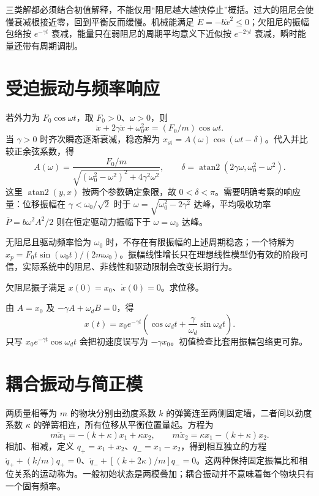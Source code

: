 \documentclass[UTF8,12pt,a4paper,fontset=fandol]{ctexbook}
\begin{document}
三类解都必须结合初值解释，不能仅用“阻尼越大越快停止”概括。过大的阻尼会使慢衰减根接近零，回到平衡反而缓慢。机械能满足 $\dot E=-b\dot x^2\le0$；欠阻尼的振幅包络按 $e^{-\gamma t}$ 衰减，能量只在弱阻尼的周期平均意义下近似按 $e^{-2\gamma t}$ 衰减，瞬时能量还带有周期调制。

\section{受迫振动与频率响应}
若外力为 $F_0\cos\omega t$，取 $F_0>0$、$\omega>0$，则
\[
 \ddot x+2\gamma\dot x+\omega_0^2x=(F_0/m)\cos\omega t.
\]
当 $\gamma>0$ 时齐次瞬态逐渐衰减，稳态解为 $x_{\mathrm{st}}=A(\omega)\cos(\omega t-\delta)$。代入并比较正余弦系数，得
\begin{equation}
 A(\omega)=\frac{F_0/m}{\sqrt{(\omega_0^2-\omega^2)^2+4\gamma^2\omega^2}},
 \qquad \delta=\operatorname{atan2}(2\gamma\omega,\omega_0^2-\omega^2).
 \label{eq:mech-forced-amplitude}
\end{equation}
这里 $\operatorname{atan2}(y,x)$ 按两个参数确定象限，故 $0<\delta<\pi$。需要明确考察的响应量：位移振幅在 $\gamma<\omega_0/\sqrt2$ 时于 $\omega=\sqrt{\omega_0^2-2\gamma^2}$ 达峰，平均吸收功率 $\overline P=b\omega^2A^2/2$ 则在恒定驱动力振幅下于 $\omega=\omega_0$ 达峰。

无阻尼且驱动频率恰为 $\omega_0$ 时，不存在有限振幅的上述周期稳态；一个特解为 $x_p=F_0t\sin(\omega_0t)/(2m\omega_0)$。振幅线性增长只在理想线性模型仍有效的阶段可信，实际系统中的阻尼、非线性和驱动限制会改变长期行为。

\begin{example}[由初值确定欠阻尼解]
欠阻尼振子满足 $x(0)=x_0$、$\dot x(0)=0$。求位移。
\end{example}
\begin{solve}
由 $A=x_0$ 及 $-\gamma A+\omega_dB=0$，得
\[
 x(t)=x_0e^{-\gamma t}\left(\cos\omega_dt+\frac\gamma{\omega_d}\sin\omega_dt\right).
\]
只写 $x_0e^{-\gamma t}\cos\omega_dt$ 会把初速度误写为 $-\gamma x_0$。初值检查比套用振幅包络更可靠。
\end{solve}

\section{耦合振动与简正模}
两质量相等为 $m$ 的物块分别由劲度系数 $k$ 的弹簧连至两侧固定墙，二者间以劲度系数 $\kappa$ 的弹簧相连，所有位移从平衡位置量起。方程为
\[
 m\ddot x_1=-(k+\kappa)x_1+\kappa x_2,\qquad
 m\ddot x_2=\kappa x_1-(k+\kappa)x_2.
\]
相加、相减，定义 $q_+=x_1+x_2$、$q_-=x_1-x_2$，得到相互独立的方程 $\ddot q_++(k/m)q_+=0$、$\ddot q_-+[(k+2\kappa)/m]q_-=0$。这两种保持固定振幅比和相位关系的运动称为。一般初始状态是两模叠加；耦合振动并不意味着每个物块只有一个固有频率。
\end{document}
